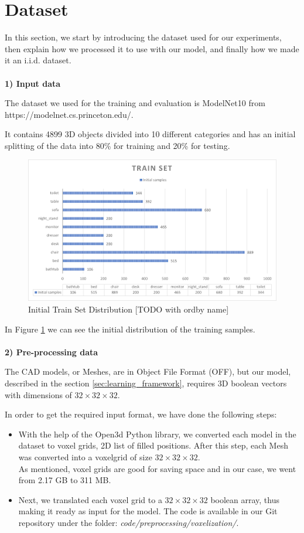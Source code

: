 \section{Dataset}
\label{sec:dataset}
In this section, we start by introducing the dataset used for our experiments, then explain how we processed it to use with our model, and finally how we made it an i.i.d. dataset.
\ \\\\%
\textbf{1) Input data} 

The dataset we used for the training and evaluation is ModelNet10 from https://modelnet.cs.princeton.edu/. 

It contains 4899 3D objects divided into 10 different categories and has an initial splitting of the data into 80\% for training and 20\% for testing.\\
\begin{figure}[]
	\centering
	\includegraphics[scale = 0.45]{resources/distribution.png}
	\caption{Initial Train Set Distribution [TODO with ordby name]}
	\label{fig:initialTrainSetDistribution}
\end{figure}
In Figure \ref{fig:initialTrainSetDistribution} we can see the initial distribution of the training samples.
\   \\\\ %
\textbf{2) Pre-processing data} 

The CAD models, or Meshes, are in Object File Format (OFF), but our model, described in the section \ref{sec:learning_framework}, requires 3D boolean vectors with dimensions of \mbox{$32\times32\times32$}.

In order to get the required input format, we have done the following steps:
\begin{itemize}
	\item With the help of the Open3d Python library, we converted each model in the dataset to voxel grids, 2D list of filled positions. After this step, each Mesh was converted into a voxelgrid of size \mbox{$32\times32\times32$}.\\
	 As mentioned, voxel grids are good for saving space and in our case, we went from 2.17 GB to 311 MB. 
	\item Next, we translated each voxel grid to a  \mbox{$32\times32\times32$} boolean array, thus making it ready as input for the model. The code is available in our Git repository under the folder:  \mbox{\textit{code/preprocessing/voxelization/}}.
\end{itemize}

